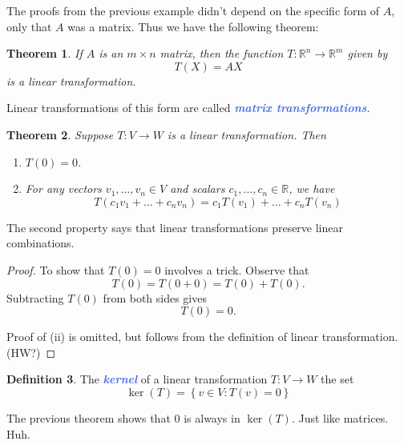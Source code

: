 \documentclass[10pt]{article}
\newcommand{\demph}[1]{\textcolor{RoyalBlue}{\textbf{\slshape #1}}} %
\newtheorem{theorem}{Theorem}
\theoremstyle{definition}
\newtheorem{definition}[theorem]{Definition}
\newcommand{\R}{\mathbb{R}}           %
\begin{document}
The proofs from the previous example didn't depend on the specific
form of $A$, only that $A$ was a matrix. Thus we have the following theorem:

\begin{theorem}
  If $A$ is an $m\times n$ matrix, then the function $T: \R^{n}\to \R^{m}$
  given by
  \begin{equation*}
    T(X) = AX
  \end{equation*}
  is a linear transformation.
\end{theorem}

Linear transformations of this form are called \demph{matrix transformations}.


\begin{theorem}
  Suppose $T:V \to W$ is a linear transformation. Then
  \begin{enumerate}[label=(\roman*)]
    \item $T(0)=0$.
    \item For any vectors $v_{1},\ldots,v_{n}\in V$ and scalars
    $c_{1},\ldots,c_{n}\in \R$, we have
    \begin{equation*}
      T(c_{1}v_{1}+\ldots+c_{n}v_{n})=
      c_{1}T(v_{1})+\ldots+c_{n}T(v_{n})
    \end{equation*}
  \end{enumerate}
\end{theorem}
The second property says that linear transformations preserve linear
combinations.
\begin{proof}
  To show that $T(0)=0$ involves a trick. Observe that
  \begin{equation*}
    T(0) = T(0+0) = T(0)+T(0).
  \end{equation*}
  Subtracting $T(0)$ from both sides gives
  \begin{equation*}
    T(0)=0.
  \end{equation*}

  Proof of (ii) is omitted, but follows from the definition of linear
  transformation. (HW?)
\end{proof}

\begin{definition}
  The \demph{kernel} of a linear transformation $T:V \to W$ the set
  \begin{equation*}
    \ker(T) = \left\{v\in V : T(v) = 0\right\} 
  \end{equation*}
\end{definition}
The previous theorem shows that $0$ is always in $\ker(T)$. Just like
matrices. Huh.
\end{document}
